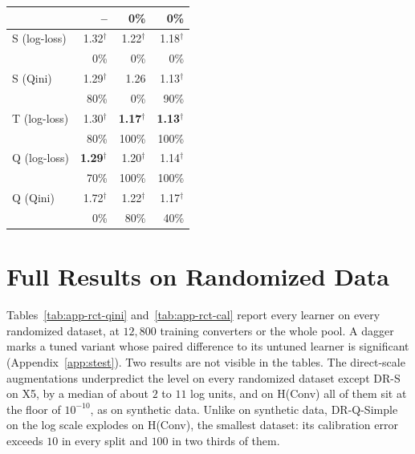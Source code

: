 \documentclass{article}
\begin{document}
\begin{table}[H]
\begin{tabular}{l|rrr}
 & \scriptsize -- & \scriptsize 0\% & \scriptsize 0\% \\[2pt]
\hline
S (log-loss) & 1.32$^\dagger$ & 1.22$^\dagger$ & 1.18$^\dagger$ \\
 & \scriptsize 0\% & \scriptsize 0\% & \scriptsize 0\% \\[2pt]
S (Qini) & 1.29$^\dagger$ & 1.26 & 1.13$^\dagger$ \\
 & \scriptsize 80\% & \scriptsize 0\% & \scriptsize 90\% \\[2pt]
T (log-loss) & 1.30$^\dagger$ & \textbf{1.17}$^\dagger$ & \textbf{1.13}$^\dagger$ \\
 & \scriptsize 80\% & \scriptsize 100\% & \scriptsize 100\% \\[2pt]
Q (log-loss) & \textbf{1.29}$^\dagger$ & 1.20$^\dagger$ & 1.14$^\dagger$ \\
 & \scriptsize 70\% & \scriptsize 100\% & \scriptsize 100\% \\[2pt]
Q (Qini) & 1.72$^\dagger$ & 1.22$^\dagger$ & 1.17$^\dagger$ \\
 & \scriptsize 0\% & \scriptsize 80\% & \scriptsize 40\% \\[2pt]
\hline
\end{tabular}
\end{table}

\section{Full Results on Randomized Data}
\label{app:real-tables}
Tables~\ref{tab:app-rct-qini} and~\ref{tab:app-rct-cal} report every learner
on every randomized dataset, at $12{,}800$ training converters or the whole
pool. A dagger marks a tuned variant whose paired difference
to its untuned learner is significant (Appendix~\ref{app:stest}). Two results
are not visible in the tables. The direct-scale augmentations underpredict the level on every randomized
dataset except DR-S on X5, by a median of about $2$ to $11$ log units, and on H(Conv) all of
them sit at the floor of $10^{-10}$, as on synthetic data. Unlike on
synthetic data, DR-Q-Simple on the log scale explodes on H(Conv), the
smallest dataset: its calibration error exceeds $10$ in every split
and $100$ in two thirds of them.
\end{document}

